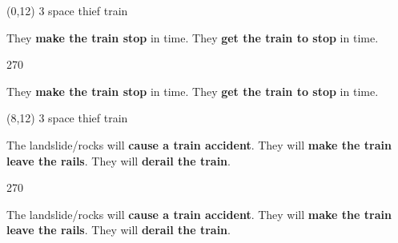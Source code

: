 \documentclass[a4paper]{article}
\newenvironment{itemize*}%
{\begin{itemize}%
 \setlength{\itemsep}{0.0cm}%
 \setlength{\parsep}{0pt}%
 \setlength{\parskip}{0pt}}%
{\end{itemize}}
\newcommand{\mycard}[3]{%
	\small #1 #2
	\par
	\parbox[t][6.8cm][c]{9.5cm}{%
	\par
	\myleft{#3}
	\par
	\myright{#3}
	}
}
\newcommand{\myleft}[1]{%
	\begin{sideways}
	\hspace*{-0.9cm}
		\parbox[t][2.7cm][t]{6.5cm}{%
		\Large #1
		}
	\end{sideways}
}
\newcommand{\myright}[1]{%
	\hspace*{6.5cm}
	\begin{turn}{270}
	\hspace*{-7.1cm}
		\parbox[t][2.7cm][t]{6.5cm}{%
		\Large #1
		}
	\end{turn}
}
\begin{document}
\begin{textblock}{8}(0,12)
\mycard{3}{space thief train}{
\begin{itemize*}
\item They \textbf{make the train stop} in time. They \textbf{get the train to stop} in time.
\end{itemize*}
}
\end{textblock}

\begin{textblock}{8}(8,12)
\mycard{3}{space thief train}{
\begin{itemize*}
\item The landslide/rocks will \textbf{cause a train accident}. They will \textbf{make the train leave the rails}. They will \textbf{derail the train}.
\end{itemize*}
}
\end{textblock}

\null
\newpage
\end{document}
